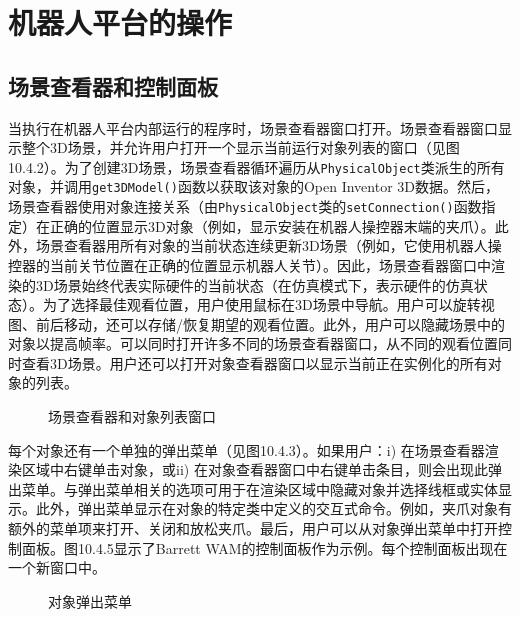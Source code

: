 \documentclass[UTF8,a4paper,12pt]{ctexart}
\begin{document}
\section{机器人平台的操作}

\subsection{场景查看器和控制面板}

当执行在机器人平台内部运行的程序时，场景查看器窗口打开。场景查看器窗口显示整个3D场景，并允许用户打开一个显示当前运行对象列表的窗口（见图10.4.2）。为了创建3D场景，场景查看器循环遍历从\texttt{PhysicalObject}类派生的所有对象，并调用\texttt{get3DModel()}函数以获取该对象的Open Inventor 3D数据。然后，场景查看器使用对象连接关系（由\texttt{PhysicalObject}类的\texttt{setConnection()}函数指定）在正确的位置显示3D对象（例如，显示安装在机器人操控器末端的夹爪）。此外，场景查看器用所有对象的当前状态连续更新3D场景（例如，它使用机器人操控器的当前关节位置在正确的位置显示机器人关节）。因此，场景查看器窗口中渲染的3D场景始终代表实际硬件的当前状态（在仿真模式下，表示硬件的仿真状态）。为了选择最佳观看位置，用户使用鼠标在3D场景中导航。用户可以旋转视图、前后移动，还可以存储/恢复期望的观看位置。此外，用户可以隐藏场景中的对象以提高帧率。可以同时打开许多不同的场景查看器窗口，从不同的观看位置同时查看3D场景。用户还可以打开对象查看器窗口以显示当前正在实例化的所有对象的列表。

\begin{figure}[htbp]
\centering
{}
\caption{场景查看器和对象列表窗口}
\label{fig:10.4.2}
\end{figure}

每个对象还有一个单独的弹出菜单（见图10.4.3）。如果用户：i) 在场景查看器渲染区域中右键单击对象，或ii) 在对象查看器窗口中右键单击条目，则会出现此弹出菜单。与弹出菜单相关的选项可用于在渲染区域中隐藏对象并选择线框或实体显示。此外，弹出菜单显示在对象的特定类中定义的交互式命令。例如，夹爪对象有额外的菜单项来打开、关闭和放松夹爪。最后，用户可以从对象弹出菜单中打开控制面板。图10.4.5显示了Barrett WAM的控制面板作为示例。每个控制面板出现在一个新窗口中。

\begin{figure}[htbp]
\centering
{}
\caption{对象弹出菜单}
\label{fig:10.4.3}
\end{figure}
\end{document}
